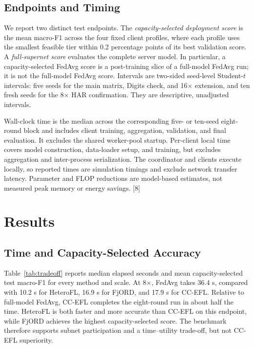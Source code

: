 \documentclass[conference]{IEEEtran}
\begin{document}
\subsection{Endpoints and Timing}
We report two distinct test endpoints. The \emph{capacity-selected deployment score} is the mean macro-F1 across the four fixed client profiles, where each profile uses the smallest feasible tier within 0.2 percentage points of its best validation score. A \emph{full-supernet score} evaluates the complete server model. In particular, a capacity-selected FedAvg score is a post-training slice of a full-model FedAvg run; it is not the full-model FedAvg score. Intervals are two-sided seed-level Student-$t$ intervals: five seeds for the main matrix, Digits check, and 16$\times$ extension, and ten fresh seeds for the 8$\times$ HAR confirmation. They are descriptive, unadjusted intervals.

Wall-clock time is the median across the corresponding five- or ten-seed eight-round block and includes client training, aggregation, validation, and final evaluation. It excludes the shared worker-pool startup. Per-client local time covers model construction, data-loader setup, and training, but excludes aggregation and inter-process serialization. The coordinator and clients execute locally, so reported times are simulation timings and exclude network transfer latency. Parameter and FLOP reductions are model-based estimates, not measured peak memory or energy savings. [8]

\section{Results}
\subsection{Time and Capacity-Selected Accuracy}
Table~\ref{tab:tradeoff} reports median elapsed seconds and mean capacity-selected test macro-F1 for every method and scale. At 8$\times$, FedAvg takes 36.4 s, compared with 10.2 s for HeteroFL, 16.9 s for FjORD, and 17.9 s for CC-EFL. Relative to full-model FedAvg, CC-EFL completes the eight-round run in about half the time. HeteroFL is both faster and more accurate than CC-EFL on this endpoint, while FjORD achieves the highest capacity-selected score. The benchmark therefore supports subnet participation and a time--utility trade-off, but not CC-EFL superiority.
\end{document}
